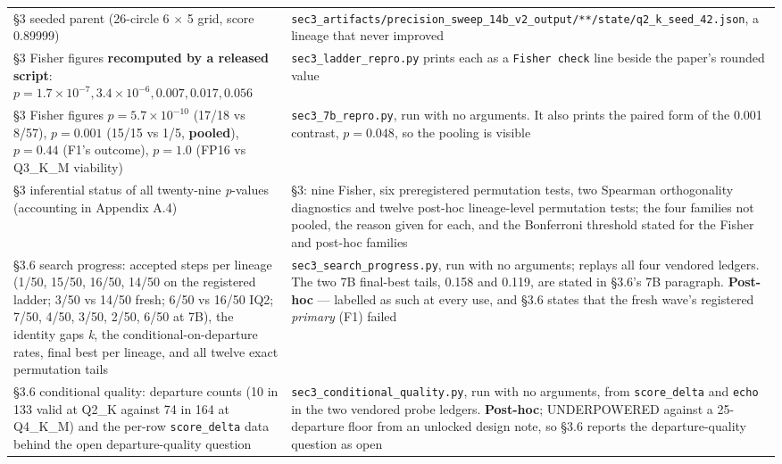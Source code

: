 \begin{longtable}{@{}p{}p{}@{}}
\S3 seeded parent (26-circle 6 $\times$ 5 grid, score 0.89999) &
\texttt{sec3\_\bk{}artifacts/\bk{}precision\_\bk{}sweep\_\bk{}14b\_\bk{}v2\_\bk{}output/\bk{}**/\bk{}state/\bk{}q2\_\bk{}k\_\bk{}seed\_\bk{}42.json}, a lineage that never improved \\

\S3 Fisher figures \textbf{recomputed by a released script}: $p = 1.7\times10^{-7}, 3.4\times10^{-6}, 0.007, 0.017, 0.056$ &
\texttt{sec3\_ladder\_repro.py} prints each as a \texttt{Fisher check} line beside the paper's rounded value \\

\S3 Fisher figures $p = 5.7\times10^{-10}$ (17/18 vs 8/57), $p=0.001$ (15/15 vs 1/5, \textbf{pooled}), $p=0.44$ (F1's outcome), $p=1.0$ (FP16 vs Q3\_K\_M viability) &
\texttt{sec3\_7b\_repro.py}, run with no arguments. It also prints the paired form of the 0.001 contrast, $p = 0.048$, so the pooling is visible \\

\S3 inferential status of all twenty-nine \emph{p}-values (accounting in Appendix A.4) &
\S3: nine Fisher, six preregistered permutation tests, two Spearman orthogonality diagnostics and twelve post-hoc lineage-level permutation tests; the four families not pooled, the reason given for each, and the Bonferroni threshold stated for the Fisher and post-hoc families \\

\S3.6 search progress: accepted steps per lineage (1/50, 15/50, 16/50, 14/50 on the registered ladder; 3/50 vs 14/50 fresh; 6/50 vs 16/50 IQ2; 7/50, 4/50, 3/50, 2/50, 6/50 at 7B), the identity gaps \emph{k}, the conditional-on-departure rates, final best per lineage, and all twelve exact permutation tails &
\texttt{sec3\_search\_progress.py}, run with no arguments; replays all four vendored ledgers. The two 7B final-best tails, 0.158 and 0.119, are stated in \S3.6's 7B paragraph. \textbf{Post-hoc} --- labelled as such at every use, and \S3.6 states that the fresh wave's registered \emph{primary} (F1) failed \\

\S3.6 conditional quality: departure counts (10 in 133 valid at Q2\_K against 74 in 164 at Q4\_K\_M) and the per-row \texttt{score\_delta} data behind the open departure-quality question &
\texttt{sec3\_conditional\_quality.py}, run with no arguments, from \texttt{score\_delta} and \texttt{echo} in the two vendored probe ledgers. \textbf{Post-hoc}; UNDERPOWERED against a 25-departure floor from an unlocked design note, so \S3.6 reports the departure-quality question as open \\


\end{longtable}
